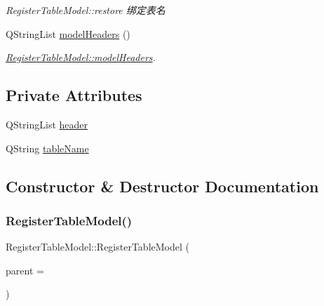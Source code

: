 \begin{DoxyCompactItemize}
\begin{DoxyCompactList}\small\item\em Register\+Table\+Model\+::restore 绑定表名 \end{DoxyCompactList}\item 
Q\+String\+List \mbox{\hyperlink{class_register_table_model_a12492b122b9be5da5694e2c82a2d8d10}{model\+Headers}} ()
\begin{DoxyCompactList}\small\item\em \mbox{\hyperlink{class_register_table_model_a12492b122b9be5da5694e2c82a2d8d10}{Register\+Table\+Model\+::model\+Headers}}. \end{DoxyCompactList}\end{DoxyCompactItemize}
\subsection*{Private Attributes}
\begin{DoxyCompactItemize}
\item 
Q\+String\+List \mbox{\hyperlink{class_register_table_model_a90768a3ec3a54146d4293997eecf2f0f}{header}}
\item 
Q\+String \mbox{\hyperlink{class_register_table_model_acca0832c89723e301820c6c680ca60a3}{table\+Name}}
\end{DoxyCompactItemize}


\subsection{Constructor \& Destructor Documentation}
\mbox{\label{class_register_table_model_a6c069ad4a389c4d7c5102318abfe7ede}} 
\subsubsection{\texorpdfstring{RegisterTableModel()}{RegisterTableModel()}}
{\footnotesize\ttfamily Register\+Table\+Model\+::\+Register\+Table\+Model (\begin{DoxyParamCaption}\item[{Q\+Object $\ast$}]{parent = {} }\end{DoxyParamCaption})\hspace{0.3cm}{\ttfamily [explicit]}}

